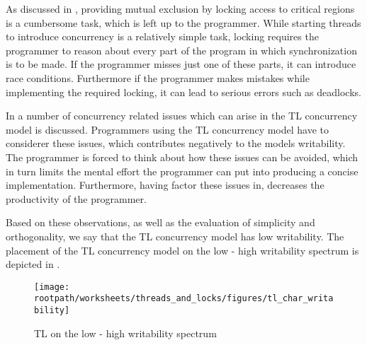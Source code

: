 As discussed in , providing mutual exclusion by locking access to critical regions is a cumbersome task, which is left up to the programmer. While starting threads to introduce concurrency is a relatively simple task, locking requires the programmer to reason about every part of the program in which synchronization is to be made. If the programmer misses just one of these parts, it can introduce race conditions. Furthermore if the programmer makes mistakes while implementing the required locking, it can lead to serious errors such as deadlocks.

In  a number of concurrency related issues which can arise in the \ac{TL} concurrency model is discussed. Programmers using the \ac{TL} concurrency model have to considerer these issues, which contributes negatively to the models writability. The programmer is forced to think about how these issues can be avoided, which in turn limits the mental effort the programmer can put into producing a concise implementation. Furthermore, having factor these issues in, decreases the productivity of the programmer.

Based on these observations, as well as the evaluation of simplicity and orthogonality, we say that the \ac{TL} concurrency model has low writability. The placement of the \ac{TL} concurrency model on the low - high writability spectrum is depicted in .

\begin{figure}[htbp]
\centering
 \texttt{[image: \\rootpath/worksheets/threads\_and\_locks/figures/tl\_char\_writability]} 
 \caption{\ac{TL} on the low - high writability spectrum}
\label{fig:char_tl_writability}
\end{figure}

\worksheetend
